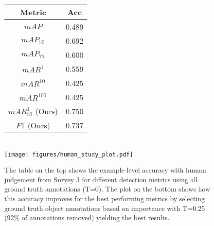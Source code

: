 \documentclass[10pt,twocolumn,letterpaper]{article}
\begin{document}
\par
\begin{figure}[t!]
\centering
\def\svgwidth{\columnwidth}
\footnotesize
\begin{tabular}{c|c} %
\hline
Metric & Acc \\
\hline
$mAP$ & 0.489 \\
$mAP_{50}$ & 0.692\\
$mAP_{75}$ & 0.600\\
$mAR^{1}$ & 0.559\\
$mAR^{10}$ & 0.425\\
$mAR^{100}$ & 0.425\\
$mAR^{1}_{50}$ (Ours) & 0.750\\
$F1$ (Ours) & 0.737 \\
\hline
\end{tabular}
\\
\texttt{[image: figures/human\_study\_plot.pdf]}
\caption{The table on the top shows the example-level accuracy with human judgement from Survey 3 for different detection metrics using all ground truth annotations (T=0). The plot on the bottom shows how this accuracy improves for the best performing metrics by selecting ground truth object annotations based on importance with T=0.25 (92\% of annotations removed) yielding the best results.}
\label{fig:accuracy}
\end{figure}
\end{document}
